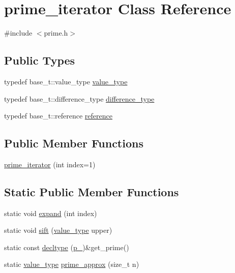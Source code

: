 \hypertarget{classyuh_1_1range__detail_1_1prime__iterator}{\section{prime\-\_\-iterator \-Class \-Reference}
\label{d9/dc8/classyuh_1_1range__detail_1_1prime__iterator}
}


{\ttfamily \#include $<$prime.\-h$>$}

\subsection*{\-Public \-Types}
\begin{DoxyCompactItemize}
\item 
typedef base\-\_\-t\-::value\-\_\-type \hyperlink{classyuh_1_1range__detail_1_1prime__iterator_ab7468d4ed49b58c84d6c1b71779fb43e}{value\-\_\-type}
\item 
typedef base\-\_\-t\-::difference\-\_\-type \hyperlink{classyuh_1_1range__detail_1_1prime__iterator_a9ac6039762e1b262cecb98589ffc1d75}{difference\-\_\-type}
\item 
typedef base\-\_\-t\-::reference \hyperlink{classyuh_1_1range__detail_1_1prime__iterator_aa5d67140d1557795cc6c30a2849d4e05}{reference}
\end{DoxyCompactItemize}
\subsection*{\-Public \-Member \-Functions}
\begin{DoxyCompactItemize}
\item 
\hyperlink{classyuh_1_1range__detail_1_1prime__iterator_ac10bb4092341faec6bbf57f1a907c7e7}{prime\-\_\-iterator} (int index=1)
\end{DoxyCompactItemize}
\subsection*{\-Static \-Public \-Member \-Functions}
\begin{DoxyCompactItemize}
\item 
static void \hyperlink{classyuh_1_1range__detail_1_1prime__iterator_a58131fc2d184d593a3cd6825bca508ee}{expand} (int index)
\item 
static void \hyperlink{classyuh_1_1range__detail_1_1prime__iterator_a8919e76bca867296647318a8e6694b72}{sift} (\hyperlink{classyuh_1_1range__detail_1_1prime__iterator_ab7468d4ed49b58c84d6c1b71779fb43e}{value\-\_\-type} upper)
\item 
static const \hyperlink{classyuh_1_1range__detail_1_1prime__iterator_a2f6d1185fb0a9c5645498e79db8e809b}{decltype} (\hyperlink{classyuh_1_1range__detail_1_1prime__iterator_aff6d0a0fbc14123c0fca5a0c05d2e68c}{p\-\_\-})\&get\-\_\-prime()
\item 
static \hyperlink{classyuh_1_1range__detail_1_1prime__iterator_ab7468d4ed49b58c84d6c1b71779fb43e}{value\-\_\-type} \hyperlink{classyuh_1_1range__detail_1_1prime__iterator_ace7af2803e2a42c5c17c5e1210e91fa6}{prime\-\_\-approx} (size\-\_\-t n)
\end{DoxyCompactItemize}
